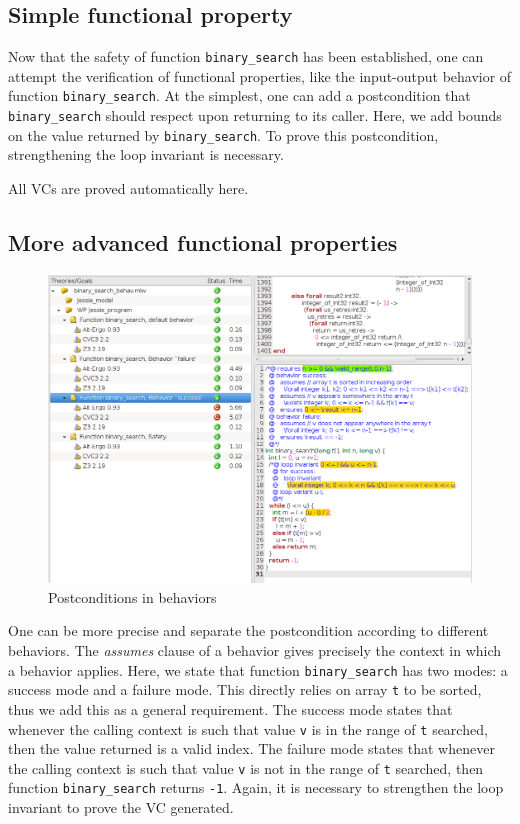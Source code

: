 \documentclass[a4paper,11pt,twoside,openright]{report}
\begin{document}
\subsection{Simple functional property}

Now that the safety of function \verb|binary_search| has been established, one
can attempt the verification of functional properties, like the
input-output behavior of function \verb|binary_search|. At the
simplest, one can add a postcondition that \verb|binary_search| should
respect upon returning to its caller. Here, we add bounds on the value
returned by \verb|binary_search|. To prove this postcondition,
strengthening the loop invariant is necessary.



All VCs are proved automatically here.

\subsection{More advanced functional properties}

\begin{figure}[t]
  \includegraphics[width=\linewidth]{jessie/binary_search_behav.png}
  \caption{Postconditions in behaviors}
  \label{fig:behav}
  \hrulefill
\end{figure}

One can be more precise and separate the postcondition according to
different behaviors. The \emph{assumes} clause of a behavior gives
precisely the context in which a behavior applies. Here, we state that
function \verb|binary_search| has two modes: a success mode and a
failure mode. This directly relies on array \verb|t| to be sorted,
thus we add this as a general requirement. The success mode states
that whenever the calling context is such that value \verb|v| is in
the range of \verb|t| searched, then the value returned is a valid
index. The failure mode states that whenever the calling context is
such that value \verb|v| is not in the range of \verb|t| searched,
then function \verb|binary_search| returns \verb|-1|.  Again, it is
necessary to strengthen the loop invariant to prove the VC generated.
\end{document}
